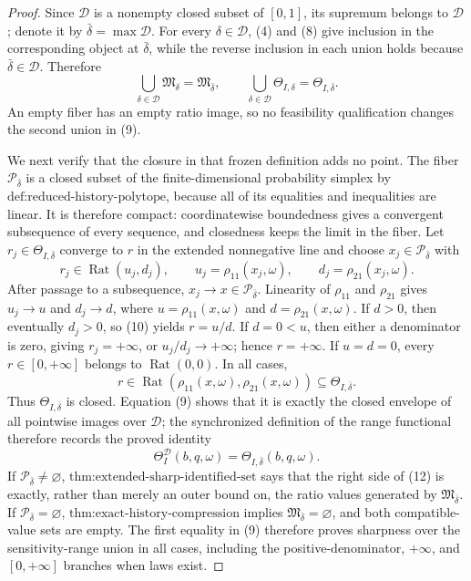 \documentclass{article}
\begin{document}
\begin{proof}
Since \(\mathcal D\) is a nonempty closed subset of \([0,1]\), its supremum belongs to \(\mathcal D\); denote it by \(\bar\delta=\max\mathcal D\).  For every \(\delta\in\mathcal D\), (4) and (8) give inclusion in the corresponding object at \(\bar\delta\), while the reverse inclusion in each union holds because \(\bar\delta\in\mathcal D\).  Therefore
\[
 \bigcup_{\delta\in\mathcal D}\mathfrak M_\delta
 =\mathfrak M_{\bar\delta},
 \qquad
 \bigcup_{\delta\in\mathcal D}\Theta_{I,\delta}
 =\Theta_{I,\bar\delta}.
\tag{9}
\]
An empty fiber has an empty ratio image, so no feasibility qualification changes the second union in (9).

We next verify that the closure in that frozen definition adds no point.  The fiber \(\mathcal P_{\bar\delta}\) is a closed subset of the finite-dimensional probability simplex by \(\text{def:reduced-history-polytope}\), because all of its equalities and inequalities are linear.  It is therefore compact: coordinatewise boundedness gives a convergent subsequence of every sequence, and closedness keeps the limit in the fiber.  Let \(r_j\in\Theta_{I,\bar\delta}\) converge to \(r\) in the extended nonnegative line and choose \(x_j\in\mathcal P_{\bar\delta}\) with
\[
 r_j\in\operatorname{Rat}(u_j,d_j),
 \qquad
 u_j=\rho_{11}(x_j,\omega),
 \qquad
 d_j=\rho_{21}(x_j,\omega).
\tag{10}
\]
After passage to a subsequence, \(x_j\to x\in\mathcal P_{\bar\delta}\).  Linearity of \(\rho_{11}\) and \(\rho_{21}\) gives \(u_j\to u\) and \(d_j\to d\), where \(u=\rho_{11}(x,\omega)\) and \(d=\rho_{21}(x,\omega)\).  If \(d>0\), then eventually \(d_j>0\), so (10) yields \(r=u/d\).  If \(d=0<u\), then either a denominator is zero, giving \(r_j=+\infty\), or \(u_j/d_j\to+\infty\); hence \(r=+\infty\).  If \(u=d=0\), every \(r\in[0,+\infty]\) belongs to \(\operatorname{Rat}(0,0)\).  In all cases,
\[
 r\in\operatorname{Rat}\!\left(\rho_{11}(x,\omega),
                                  \rho_{21}(x,\omega)\right)
 \subseteq\Theta_{I,\bar\delta}.
\tag{11}
\]
Thus \(\Theta_{I,\bar\delta}\) is closed.  Equation (9) shows that it is exactly the closed envelope of all pointwise images over \(\mathcal D\); the synchronized definition of the range functional therefore records the proved identity
\[
 \Theta_I^{\mathcal D}(b,q,\omega)
 =\Theta_{I,\bar\delta}(b,q,\omega).
\tag{12}
\]
If \(\mathcal P_{\bar\delta}\neq\varnothing\), \(\text{thm:extended-sharp-identified-set}\) says that the right side of (12) is exactly, rather than merely an outer bound on, the ratio values generated by \(\mathfrak M_{\bar\delta}\).  If \(\mathcal P_{\bar\delta}=\varnothing\), \(\text{thm:exact-history-compression}\) implies \(\mathfrak M_{\bar\delta}=\varnothing\), and both compatible-value sets are empty.  The first equality in (9) therefore proves sharpness over the sensitivity-range union in all cases, including the positive-denominator, \(+\infty\), and \([0,+\infty]\) branches when laws exist.


\end{proof}
\end{document}
